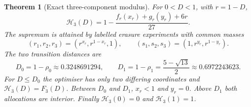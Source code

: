 \documentclass[11pt,a4paper]{article}
\newtheorem{theorem}{Theorem}[section]
\theoremstyle{definition}\newtheorem{definition}[theorem]{Definition}
\theoremstyle{remark}\newtheorem{remark}[theorem]{Remark}
\begin{document}
\begin{theorem}[Exact three-component modulus]\label{thm:three}
For $0<D<1$, with $r=1-D$,
\begin{equation}\label{eq:H3}
\mathcal H_3(D)=1-\frac{f_r(x_r)+g_r(y_r)+6r}{27}.
\end{equation}
The supremum is attained by labelled erasure experiments with common masses
\begin{equation}\label{eq:optmasses}
(r_1,r_2,r_3)=(r^{x_r},r^{1-x_r},1),\qquad
(s_1,s_2,s_3)=(1,r^{y_r},r^{1-y_r}).
\end{equation}
The two transition distances are
\[
D_0=1-\rho_0\approx0.3248691294,\qquad
D_1=1-\rho_1=\frac{5-\sqrt{13}}2\approx0.6972243623.
\]
For $D\le D_0$ the optimiser has only two differing coordinates and $\mathcal H_3(D)=F_3(D)$. Between $D_0$ and $D_1$, $x_r<1$ and $y_r=0$. Above $D_1$ both allocations are interior. Finally $\mathcal H_3(0)=0$ and $\mathcal H_3(1)=1$.
\end{theorem}
\end{document}

